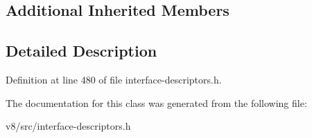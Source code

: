 \subsection*{Additional Inherited Members}


\subsection{Detailed Description}


Definition at line 480 of file interface-\/descriptors.\+h.



The documentation for this class was generated from the following file\+:\begin{DoxyCompactItemize}
\item 
v8/src/interface-\/descriptors.\+h\end{DoxyCompactItemize}

